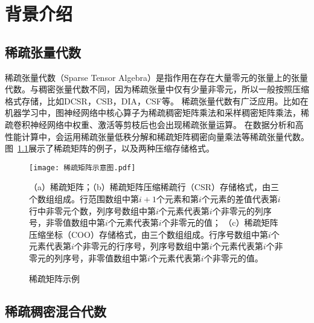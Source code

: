 
\chapter{背景介绍}

\section{稀疏张量代数}
稀疏张量代数（Sparse Tensor Algebra）是指作用在存在大量零元的张量上的张量代数。与稠密张量代数不同，因为稀疏张量中仅有少量非零元，所以一般按照压缩格式存储，比如DCSR\cite{DCSR}，CSB\cite{CSB}，DIA\cite{DIA}，CSF\cite{CSF}等。
稀疏张量代数有广泛应用。比如在机器学习中，图神经网络\cite{kipf2016semi, hamilton2017inductive}中核心算子为稀疏稠密矩阵乘法和采样稠密矩阵乘法，稀疏卷积神经网络中权重、激活等剪枝后也会出现稀疏张量运算\cite{liu2015sparse}。
在数据分析和高性能计算中，会运用稀疏张量低秩分解\cite{kolda2009tensor}和稀疏矩阵稠密向量乘法\cite{bell2012exposing}等稀疏张量代数。图~\ref{fig:sparse-intro}展示了稀疏矩阵的例子，以及两种压缩存储格式。
\begin{figure}
  \centering
  \texttt{[image: 稀疏矩阵示意图.pdf]}
  \caption*{（a）稀疏矩阵；（b）稀疏矩阵压缩稀疏行（CSR）存储格式，由三个数组组成。行范围数组中第$i+1$个元素和第$i$个元素的差值代表第$i$行中非零元个数，列序号数组中第$i$个元素代表第$i$个非零元的列序号，非零值数组中第$i$个元素代表第$i$个非零元的值；
  （c）稀疏矩阵压缩坐标（COO）存储格式，由三个数组组成。行序号数组中第$i$个元素代表第$i$个非零元的行序号，列序号数组中第$i$个元素代表第$i$个非零元的列序号，非零值数组中第$i$个元素代表第$i$个非零元的值。}
  \caption{稀疏矩阵示例}
  \label{fig:sparse-intro}
\end{figure}

\section{稀疏稠密混合代数}
